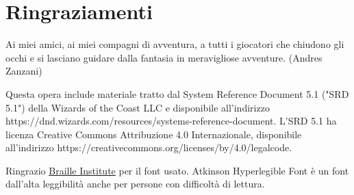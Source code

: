 \section{Ringraziamenti}

\begin{changemargin}{0.3cm}{0.3cm}\begin{enfasi}{
			\begin{center}
Ai miei amici, ai miei compagni di avventura, a tutti i giocatori che chiudono gli occhi e si lasciano guidare dalla fantasia in meravigliose avventure. (Andres Zanzani)
			\end{center}
}\end{enfasi}\end{changemargin}

\medskip

Questa opera include materiale tratto dal System Reference Document 5.1 ("SRD 5.1") della Wizards of the Coast LLC e disponibile all'indirizzo https://dnd.wizards.com/resources/systems-reference-document. L'SRD 5.1 ha licenza Creative Commons Attribuzione 4.0 Internazionale, disponibile all'indirizzo https://creativecommons.org/licenses/by/4.0/legalcode.


\medskip


Ringrazio \href{https://www.brailleinstitute.org/freefont/}{Braille Institute} per il font usato. Atkinson Hyperlegible Font è un font dall'alta leggibilità anche per persone con difficoltà di lettura.

